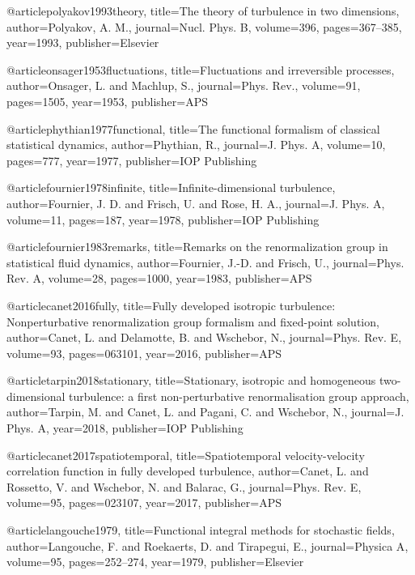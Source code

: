   @article{polyakov1993theory,
  title={{The theory of turbulence in two dimensions}},
  author={Polyakov, A. M.},
  journal={Nucl. Phys. B},
  volume={396},
  pages={367--385},
  year={1993},
  publisher={Elsevier}
  }

  @article{onsager1953fluctuations,
  title={{Fluctuations and irreversible processes}},
  author={Onsager, L. and Machlup, S.},
  journal={Phys. Rev.},
  volume={91},
  pages={1505},
  year={1953},
  publisher={APS}
  }

  @article{phythian1977functional,
  title={{The functional formalism of classical statistical dynamics}},
  author={Phythian, R.},
  journal={J. Phys. A},
  volume={10},
  pages={777},
  year={1977},
  publisher={IOP Publishing}
  }

  @article{fournier1978infinite,
  title={{Infinite-dimensional turbulence}},
  author={Fournier, J. D. and Frisch, U. and Rose, H. A.},
  journal={J. Phys. A},
  volume={11},
  pages={187},
  year={1978},
  publisher={IOP Publishing}
  }

  @article{fournier1983remarks,
  title={{Remarks on the renormalization group in statistical fluid dynamics}},
  author={Fournier, J.-D. and Frisch, U.},
  journal={Phys. Rev. A},
  volume={28},
  pages={1000},
  year={1983},
  publisher={APS}
  }

  @article{canet2016fully,
    title={{Fully developed isotropic turbulence: Nonperturbative renormalization group formalism and fixed-point solution}},
    author={Canet, L. and Delamotte, B. and Wschebor, N.},
    journal={Phys. Rev. E},
    volume={93},
    pages={063101},
    year={2016},
    publisher={APS}
  }

  @article{tarpin2018stationary,
    title={{Stationary, isotropic and homogeneous two-dimensional turbulence: a first non-perturbative renormalisation group approach}},
    author={Tarpin, M. and Canet, L. and Pagani, C. and Wschebor, N.},
    journal={J. Phys. A},
    year={2018},
    publisher={IOP Publishing}
  }

  @article{canet2017spatiotemporal,
    title={{Spatiotemporal velocity-velocity correlation function in fully developed turbulence}},
    author={Canet, L. and Rossetto, V. and Wschebor, N. and Balarac, G.},
    journal={Phys. Rev. E},
    volume={95},
    pages={023107},
    year={2017},
    publisher={APS}
  }

  @article{langouche1979,
    title={{Functional integral methods for stochastic fields}},
    author={Langouche, F. and Roekaerts, D. and Tirapegui, E.},
    journal={Physica A},
    volume={95},
    pages={252--274},
    year={1979},
    publisher={Elsevier}
  }


